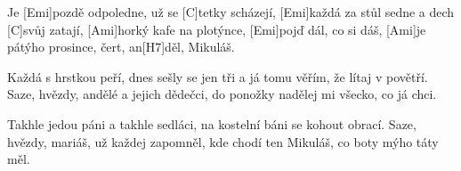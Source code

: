 
\sloka
Je [Emi]pozdě odpoledne, už se [C]tetky scházejí,
[Emi]každá za stůl sedne a dech [C]svůj zatají,
[Ami]horký kafe na plotýnce, [Emi]pojď dál, co si dáš,
[Ami]je pátýho prosince, čert, an[H7]děl, Mikuláš.

\sloka
Každá s hrstkou peří, dnes sešly se jen tři
a já tomu věřím, že lítaj v povětří.
Saze, hvězdy, andělé a jejich dědečci,
do ponožky nadělej mi všecko, co já chci.

\sloka
Takhle jedou páni a takhle sedláci,
na kostelní báni se kohout obrací.
Saze, hvězdy, mariáš, už každej zapomněl,
kde chodí ten Mikuláš, co boty mýho táty měl.
